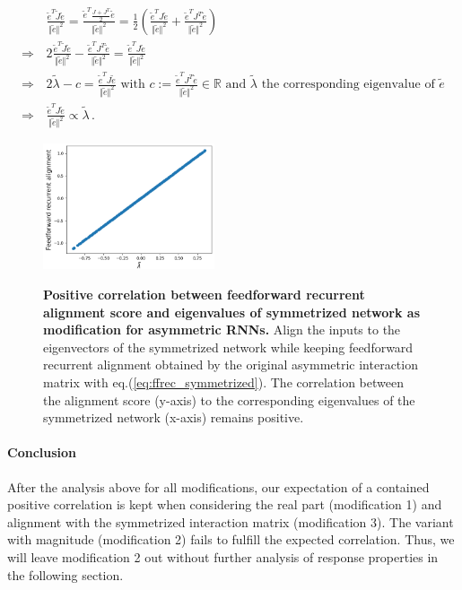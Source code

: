 \documentclass[11pt]{article}
\begin{document}
		\begin{equation}
			\begin{split}
				&\frac{\tilde{e}^T \tilde{J} \tilde{e}}{\Vert \tilde{e} \Vert^2} = \frac{\tilde{e}^T \frac{J + J^T}{2} \tilde{e}}{\Vert \tilde{e} \Vert^2} = \frac{1}{2} \left( \frac{\tilde{e}^T J \tilde{e}}{\Vert \tilde{e} \Vert^2} + \frac{\tilde{e}^T J^T \tilde{e}}{\Vert \tilde{e} \Vert^2} \right) \\
				\Rightarrow \,  & 2 \frac{\tilde{e}^T \tilde{J} \tilde{e}}{\Vert \tilde{e} \Vert^2} - \frac{\tilde{e}^T J^T \tilde{e}}{\Vert \tilde{e} \Vert^2} = \frac{\tilde{e}^T J \tilde{e}}{\Vert \tilde{e} \Vert^2} \\ 
				\Rightarrow \, & 2 \tilde{\lambda} - c = \frac{\tilde{e}^T J \tilde{e}}{\Vert \tilde{e} \Vert^2} \text{ with } c := \frac{\tilde{e}^T J^T \tilde{e}}{\Vert \tilde{e} \Vert^2} \in \mathbb{R} \text{ and $\tilde{\lambda}$ the corresponding eigenvalue of $\tilde{e}$} \\
				\Rightarrow \, & \frac{\tilde{e}^T J \tilde{e}}{\Vert \tilde{e} \Vert^2} \propto \tilde{\lambda} \, .
			\end{split}
		\end{equation}
	\begin{figure}
		\centering
		\caption{\textbf{Positive correlation between feedforward recurrent alignment score and eigenvalues of symmetrized network as modification for asymmetric RNNs.} Align the inputs to the eigenvectors of the symmetrized network while keeping feedforward recurrent alignment obtained by the original asymmetric interaction matrix with eq.(\ref{eq:ffrec_symmetrized}). The correlation between the alignment score (y-axis) to the corresponding eigenvalues of the symmetrized network (x-axis) remains positive.}
		\includegraphics[width=0.45\textwidth]{../figures/ffrec_eigval_symmetrized_J.png}
		\label{fig:ffrec_symmetrized}
	\end{figure}
	
	\paragraph{Conclusion} After the analysis above for all modifications, our expectation of a contained positive correlation is kept when considering the real part (modification 1) and alignment with the symmetrized interaction matrix (modification 3). The variant with magnitude (modification 2) fails to fulfill the expected correlation. Thus, we will leave modification 2 out without further analysis of response properties in the following section. 
	
\end{document}

